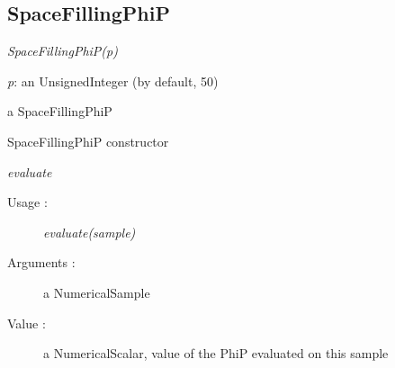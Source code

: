 \subsection{SpaceFillingPhiP}
\begin{description}

\item[Usage:] \rule{0pt}{1em}
  \begin{description}
  \item \textit{SpaceFillingPhiP(p)}
  \end{description}

\item[Arguments:]  \rule{0pt}{1em}
  \begin{description}
  \item \textit{p}: an UnsignedInteger (by default, 50)
  \end{description}

\item[Value :] a SpaceFillingPhiP

\item[Details :]  \rule{0pt}{1em}
  \begin{description}
  \item SpaceFillingPhiP constructor
  \end{description}

\item \textit{evaluate}
  \begin{description}
  \item[Usage :] \textit{evaluate(sample)}
  \item[Arguments :] a NumericalSample
  \item[Value :] a NumericalScalar, value of the PhiP evaluated on this sample
  \end{description}

\end{description}

